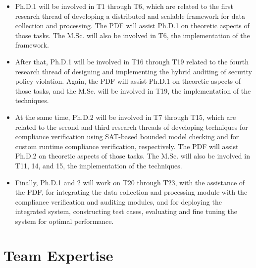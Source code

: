 \documentclass[12pt]{article}
\begin{document}
\vspace{-3mm}
\begin{itemize}
\addtolength{\itemsep}{-0.5\baselineskip}
\item Ph.D.1 will be involved in T1 through T6, which are related to
  the first research thread of developing a distributed and scalable
  framework for data collection and processing. The PDF will assist
  Ph.D.1 on theoretic aspects of those tasks. The M.Sc. will also be
  involved in T6, the implementation of the framework.
 
\item After that, Ph.D.1 will be involved in T16 through T19 related
  to the fourth research thread of designing and implementing the
  hybrid auditing of security policy violation. Again, the PDF will
  assist Ph.D.1 on theoretic aspects of those tasks, and the
  M.Sc. will be involved in T19, the implementation of the techniques.

\item At the same time, Ph.D.2 will be involved in T7 through T15,
  which are related to the second and third research threads of
  developing techniques for compliance verification using SAT-based
  bounded model checking and for custom runtime compliance
  verification, respectively. The PDF will assist Ph.D.2 on theoretic
  aspects of those tasks. The M.Sc. will also be involved in T11, 14,
  and 15, the implementation of the techniques.

\item Finally, Ph.D.1 and 2 will work on T20 through T23, with the
  assistance of the PDF, for integrating the data collection and
  processing module with the compliance verification and auditing
  modules, and for deploying the integrated system, constructing test
  cases, evaluating and fine tuning the system for optimal
  performance.
\end{itemize}

\vspace{-3mm}
\section{Team Expertise}
\vspace{-2mm}
\end{document}
